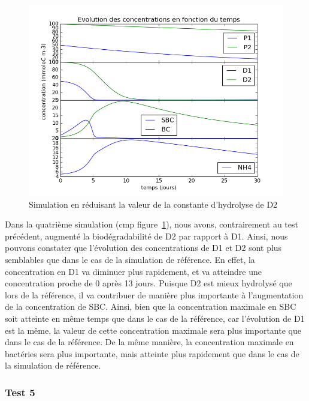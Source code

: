 \par{
\begin{figure}[h!]
  \includegraphics[width=\textwidth]{partie2/Test4.png}
  \caption{Simulation en r\'eduisant la valeur de la constante d'hydrolyse de D2
  }
  \label{fig:partie2test4}
\end{figure}
}
\par{
Dans la quatrième simulation (cmp figure~\ref{fig:partie2test4}),
nous avons, contrairement au test pr\'ec\'edent, augment\'e la biod\'egradabilit\'e de D2 par rapport \`a D1. Ainsi, nous pouvons constater que l'\'evolution des concentrations de D1 et D2 sont plus semblables que dans le cas de la simulation de r\'ef\'erence. En effet, la concentration en D1 va diminuer plus rapidement, et va atteindre une concentration proche de 0 apr\`es 13 jours. Puisque D2 est mieux hydrolys\'e que lors de la r\'ef\'erence, il va contribuer de mani\`ere plus importante \`a l'augmentation de la concentration de SBC. Ainsi, bien que la concentration maximale en SBC soit atteinte en m\^eme temps que dans le cas de la r\'ef\'erence, car l'\'evolution de D1 est la m\^eme, la valeur de cette concentration maximale sera plus importante que dans le cas de la r\'ef\'erence. De la m\^eme mani\`ere, la concentration maximale en bact\'eries sera plus importante, mais atteinte plus rapidement que dans le cas de la simulation de r\'ef\'erence.
}

\FloatBarrier
\newpage
\subsubsection{Test 5}

